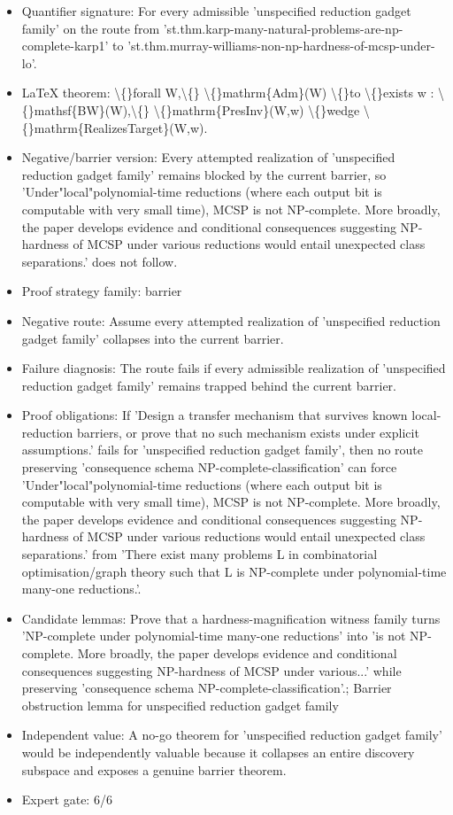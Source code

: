 \documentclass[11pt]{article}
\begin{document}
\begin{itemize}
\item Quantifier signature: For every admissible 'unspecified reduction gadget family' on the route from 'st.thm.karp-many-natural-problems-are-np-complete-karp1' to 'st.thm.murray-williams-non-np-hardness-of-mcsp-under-lo'.
\item LaTeX theorem: \textbackslash\{\}forall W,\textbackslash\{\} \textbackslash\{\}mathrm\{Adm\}(W) \textbackslash\{\}to \textbackslash\{\}exists w : \textbackslash\{\}mathsf\{BW\}(W),\textbackslash\{\} \textbackslash\{\}mathrm\{PresInv\}(W,w) \textbackslash\{\}wedge \textbackslash\{\}mathrm\{RealizesTarget\}(W,w).
\item Negative/barrier version: Every attempted realization of 'unspecified reduction gadget family' remains blocked by the current barrier, so 'Under"local"polynomial-time reductions (where each output bit is computable with very small time), MCSP is not NP-complete. More broadly, the paper develops evidence and conditional consequences suggesting NP-hardness of MCSP under various reductions would entail unexpected class separations.' does not follow.
\item Proof strategy family: barrier
\item Negative route: Assume every attempted realization of 'unspecified reduction gadget family' collapses into the current barrier.
\item Failure diagnosis: The route fails if every admissible realization of 'unspecified reduction gadget family' remains trapped behind the current barrier.
\item Proof obligations: If 'Design a transfer mechanism that survives known local-reduction barriers, or prove that no such mechanism exists under explicit assumptions.' fails for 'unspecified reduction gadget family', then no route preserving 'consequence schema NP-complete-classification' can force 'Under"local"polynomial-time reductions (where each output bit is computable with very small time), MCSP is not NP-complete. More broadly, the paper develops evidence and conditional consequences suggesting NP-hardness of MCSP under various reductions would entail unexpected class separations.' from 'There exist many problems L in combinatorial optimisation/graph theory such that L is NP-complete under polynomial-time many-one reductions.'.
\item Candidate lemmas: Prove that a hardness-magnification witness family turns 'NP-complete under polynomial-time many-one reductions' into 'is not NP-complete. More broadly, the paper develops evidence and conditional consequences suggesting NP-hardness of MCSP under various...' while preserving 'consequence schema NP-complete-classification'.; Barrier obstruction lemma for unspecified reduction gadget family
\item Independent value: A no-go theorem for 'unspecified reduction gadget family' would be independently valuable because it collapses an entire discovery subspace and exposes a genuine barrier theorem.
\item Expert gate: 6/6
\end{itemize}
\end{document}
